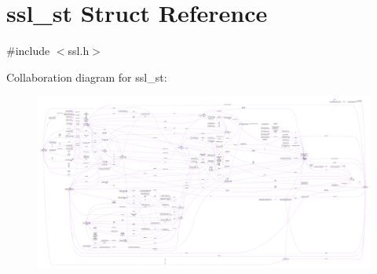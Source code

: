 \hypertarget{structssl__st}{}\section{ssl\+\_\+st Struct Reference}
\label{structssl__st}


{\ttfamily \#include $<$ssl.\+h$>$}



Collaboration diagram for ssl\+\_\+st\+:\nopagebreak
\begin{figure}[H]
\begin{center}
\leavevmode
\includegraphics[width=350pt]{structssl__st__coll__graph}
\end{center}
\end{figure}
